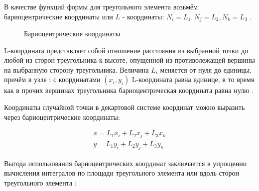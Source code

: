 \documentclass[a4paper, 14pt]{extarticle}
\begin{document}
В качестве функций формы для треугольного элемента возьмём бариоцентрические координаты или $L$ - координаты: $N_i = L_1, N_j = L_2, N_k = L_3$ \cite{12}. 

\newpage

\begin{figure}[h]
\caption{Бариоцентрические координаты}
\label{fig:bario}
\end{figure}

L-координата представляет собой отношение расстояния из выбранной точки до любой из сторон треугольника к высоте, опущенной из противолежащей вершины на выбранную сторону треугольника. Величина $L_i$ меняется от нуля до единицы, причём в узле i с координатами $(x_i, y_i)$ L-координата равна единице, в то время как в прочих вершинах треугольника бариоцентрическая координата равна нулю \cite{13}.

Координаты случайной точки в декартовой системе координат можно выразить через бариоцентрические координаты:

\begin{eqnarray*}
x = L_1 x_i + L_2 x_j + L_3 x_k \\
y = L_1 y_i + L_2 y_j + L_3 y_k
\end{eqnarray*}

Выгода использования бариоцентрических координат заключается в упрощении вычисления интегралов по площади треугольного элемента или вдоль сторон треугольного элемента \cite{14}:
\end{document}
